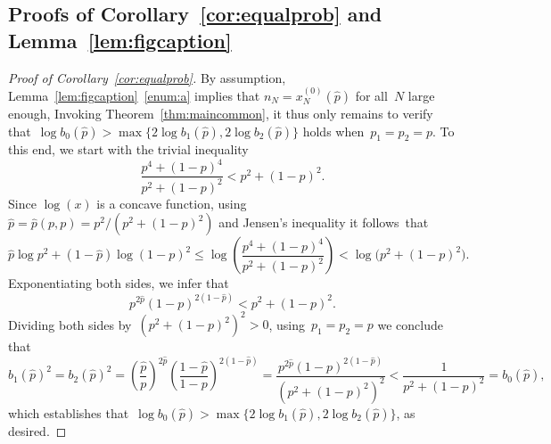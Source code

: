 \documentclass{article}
\newcommand\lrpar[1]{\left(#1\right)}
\newcommand{\xot}{x^{(0)}}
\newcommand{\ps}{\hat{p}}
\newcommand\bigpar[1]{\bigl(#1\bigr)}
\begin{document}
\subsection{Proofs of Corollary~\ref{cor:equalprob} and Lemma~\ref{lem:figcaption}}\label{sec:keylemma:apx}\begin{proof}[Proof of Corollary~\ref{cor:equalprob}]
By assumption, Lemma~\ref{lem:figcaption}~\ref{enum:a} implies that $n_N=\xot_N(\ps)$ for all~$N$ large enough, 
Invoking Theorem~\ref{thm:maincommon}, it thus only remains to verify that~$\log b_0(\ps) > \max\{2\log b_1(\ps),2\log b_2(\ps)\}$ holds when~$p_1=p_2=p$. 
To this end, we start with the trivial inequality 
\[ \frac{p^4+(1-p)^4}{p^2+(1-p)^2}<p^2+(1-p)^2.\]
Since $\log(x)$ is a concave function, using~$\ps=\ps(p,p)=p^2/(p^2+(1-p)^2)$ and Jensen's inequality it follows~that
\[ \ps \log p^2 +(1-\ps) \log (1-p)^2 \le \log\lrpar{\frac{p^4+(1-p)^4}{p^2+(1-p)^2}} < \log\bigpar{p^2+(1-p)^2}.\]
Exponentiating both sides, we infer that
\[ p^{2\ps} (1-p)^{2(1-\ps)}< p^2+(1-p)^2.\]
Dividing both sides by~$(p^2+(1-p)^2)^2>0$, using~$p_1=p_2=p$ we conclude that
\[b_1(\ps)^2=b_2(\ps)^2= \lrpar{\frac{\ps}{p}}^{2\ps} \lrpar{\frac{1-\ps}{1-p}}^{2(1-\ps)}=\frac{p^{2\ps}(1-p)^{2(1-\ps)}}{(p^2+(1-p)^2)^2}< \frac{1}{p^2+(1-p)^2}=b_0(\ps), \]
which establishes that~$\log b_0(\ps) > \max\{2\log b_1(\ps),2\log b_2(\ps)\}$, 
as desired.
\end{proof}
\end{document}
